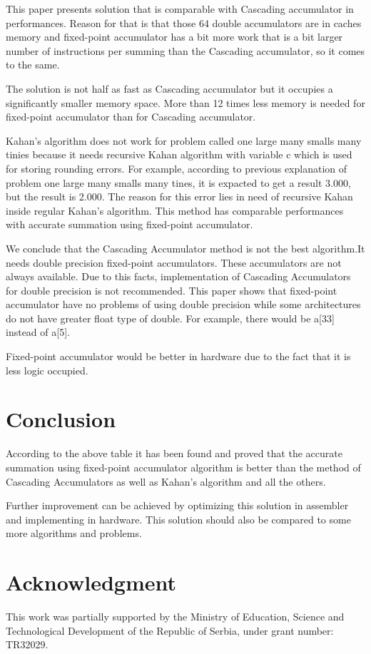 \documentclass[conference]{IEEEtran}
\begin{document}
\par  
This paper presents solution that is comparable with Cascading 
accumulator in performances. Reason for that is that those 64 
double accumulators are in caches memory and fixed-point accumulator 
has a bit more work that is a bit larger number of instructions 
per summing than the Cascading accumulator, so it comes to the same.
\par 
The solution is not half as fast as Cascading accumulator but it 
occupies a significantly smaller memory space. More than 12 times 
less memory is needed for fixed-point accumulator than for Cascading accumulator.
\par 
Kahan's algorithm does not work for problem called one large 
many smalls many tinies because it needs recursive Kahan 
algorithm with variable c which is used for storing rounding errors. 
For example, according to previous explanation of problem one 
large many smalls many tines, it is expacted to get a result 3.000, 
but the result is 2.000. The reason for this error lies in need of 
recursive Kahan inside regular Kahan's algorithm. This method has 
comparable performances with accurate summation using fixed-point accumulator.
\par 
We conclude that the Cascading Accumulator method is not the
best algorithm.It needs double precision fixed-point accumulators.
These accumulators are not always available. Due to this facts, implementation of 
Cascading Accumulators for double precision is not recommended. 
This paper shows that fixed-point accumulator have no problems of 
using double precision while some architectures do not have greater float type of double. 
For example, there would be a[33] instead of a[5]. %
\par 
Fixed-point accumulator would be better in hardware due to the fact that it is less logic occupied.

\section{Conclusion}
According to the above table it has been found and proved
that the accurate summation using fixed-point accumulator 
algorithm is better than the method of Cascading Accumulators 
as well as Kahan's algorithm and all the others.
\par
Further improvement can be achieved by optimizing this
solution in assembler and implementing in hardware. 
This solution should also be compared to some more 
algorithms and problems. 

\section*{Acknowledgment}
This work was partially supported by the Ministry of Education, 
Science and Technological Development of the Republic of Serbia, 
under grant number: TR32029.




\end{document}
